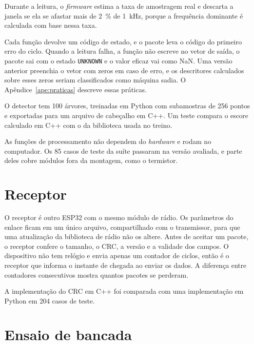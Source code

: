 Durante a leitura, o \emph{firmware} estima a taxa de amostragem real e descarta a janela
se ela se afastar mais de \SI{2}{\percent} de \SI{1}{\kilo\hertz}, porque a frequência
dominante é calculada com base nessa taxa.

Cada função devolve um código de estado, e o pacote leva o código do primeiro erro do ciclo.
Quando a leitura falha, a função não escreve no vetor de saída, o pacote sai com o estado
\texttt{UNKNOWN} e o valor eficaz vai como NaN. Uma versão anterior preenchia o vetor com
zeros em caso de erro, e os descritores calculados sobre esses zeros seriam classificados
como máquina sadia. O Apêndice~\ref{ape:praticas} descreve essas práticas.

O detector tem \num{100} árvores, treinadas em Python com subamostras de \num{256} pontos e
exportadas para um arquivo de cabeçalho em C++. Um teste compara o escore calculado em C++
com o da biblioteca usada no treino. 

As funções de processamento não dependem do \emph{hardware} e rodam no computador. Os
\num{85} casos de teste da suíte passaram na versão avaliada, e parte deles cobre módulos fora da
montagem, como o termistor.

\section{Receptor}
\label{sec:dev-comunicacao}

O receptor é outro ESP32 com o mesmo módulo de rádio. Os parâmetros do enlace ficam em um
único arquivo, compartilhado com o transmissor, para que uma atualização da biblioteca de
rádio não os altere. Antes de aceitar um pacote, o receptor confere o tamanho, o CRC, a
versão e a validade dos campos. O dispositivo não tem relógio e envia apenas um contador de
ciclos, então é o receptor que informa o instante de chegada ao enviar os dados. A diferença entre
contadores consecutivos mostra quantos pacotes se perderam.

A implementação do CRC em C++ foi comparada com uma implementação em Python em \num{204} casos
de teste. 

\section{Ensaio de bancada}
\label{sec:dev-bancada}

